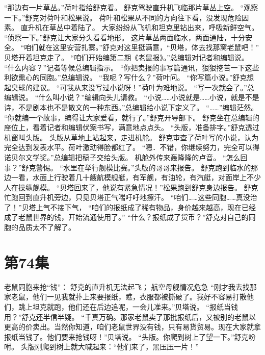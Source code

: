 \documentclass[a4paper,12pt,UTF8,twoside]{ctexbook}
\begin{document}
        “那边有一片草丛。”荷叶指给舒克看。 
        舒克驾驶直升机飞临那片草丛上空。 
        “观察一下。”舒克对荷叶和松果说。 
        荷叶和松果从不同的方向往下看，没发现危险因素。 
        直升机在草丛中着陆了。 
        大家纷纷从飞机和坦克里钻出来，呼吸新鲜空气。 
        “侦察一下。”舒克让大家分头看看地形。 
        这片草丛两面临水，两面通陆，十分安全。 
        “咱们就在这里安营扎寨。”舒克对这里挺满意，“贝塔，体去找那窝老鼠吧！” 
        贝塔开着坦克走了。 
        “咱们开始编第二期《老鼠报》。”总编辑对记者和编辑说。 
        “什么内容？”记者等候总编辑指示。 
        “你把卖报的事写篇通讯，狠狠挖苦一下这些利欲熏心的同胞。”总编辑说。 
        “我呢？写什么？”荷叶问。 
        “你写篇小说。”舒克想起臭球的建议。 
        “可我从来没写过小说呀！”荷叶为难地说。 
        “写一次就会了。”总编辑说。 
        “什么叫小说？”编辑向头儿请教。 
        “小说……小说就是……小说，就是不是诗，不是剧本也不是散文的一种东西。”总编辑给小说下定义了。 
        “……”编辑茫然。 
        “你就编一个故事，编得让大家爱看，就行了。”舒克开导部下。 
        舒克坐在总编辑的座位上，看着记者和编辑伏案书写，满意地点点头。 
        “头版，准备排字。”舒克透过机窗叫头版。 
        头版从草地上站起来，走进机舱。 
        舒克审查了荷叶写的小说，认为完全达到发表水平。荷叶激动得脸都红了。 
        “嗯．不错，你继续努力，完全可以得诺贝尔文学奖。”总编辑把稿子交给头版。 
        机舱外传来轰隆隆的卢音。 
        “怎么回事？”舒克警惕。 
        “水里在举行舰模比赛。”头版的哥哥来报告。 
        舒克跑到临水的那边一看，水面上行驶着几十艘航模舰艇，有军舰，有油轮，有汽艇，对面岸上不少人在操纵舰模。 
        “贝塔回来了，他说有紧急情况！”松果跑到舒克身边报告。 
        舒克忙跑回到直升机旁边，只见贝塔正气喘吁吁地擦汗。 
        “咱们……这些同胞……真没治了！”贝塔上气不接下气，  “咱们的报纸成了稀有物品，身价越来越高，现在已经成了老鼠世界的钱，开始流通使用了。” 
        “什么？报纸成了货币？”舒克对自己的同胞的品质太不了解了。   \chapter{第74集} 
        老鼠同胞来抢“钱”： 
        舒克的直升机无法起飞； 
        航空母舰情况危急   
        “刚才我去找那家老鼠，他们一见我就扑上来要报纸，瞧，衣服都被撕破了。我好不容易打散他们，跳上坦克就跑，他们还在后边追呢，一会儿准来。”贝塔说。 
        “报纸当钱用？”舒克还半信半疑。 
        “千真万确。那家老鼠卖了那批报纸后，又被别的老鼠以更高的价卖出。当然你知道，咱们老鼠世界没有钱，只有易货贸易。现在大家就拿报纸当钱了。他们要来抢钱呀！”贝塔说。 
        “头版。你爬到树上了望一下。”舒克吩咐。 
        头版刚爬到树上就大喊起来：“他们来了，黑压压一片！” 
\end{document}
